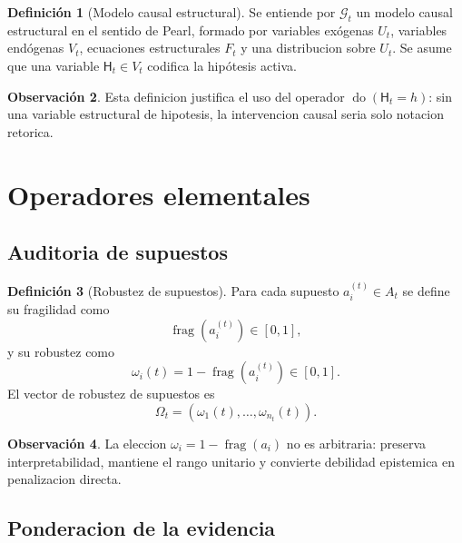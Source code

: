 \documentclass[12pt,a4paper]{article}
\newcommand{\doop}{\operatorname{do}}
\newcommand{\frag}{\operatorname{frag}}
\theoremstyle{definition}
\newtheorem{definition}{Definici\'on}[section]
\newtheorem{remark}[definition]{Observaci\'on}
\theoremstyle{plain}
\theoremstyle{remark}
\begin{document}
\begin{definition}[Modelo causal estructural]
Se entiende por $\mathcal{G}_t$ un modelo causal estructural en el sentido de Pearl, formado por variables ex\'ogenas $U_t$, variables end\'ogenas $V_t$, ecuaciones estructurales $F_t$ y una distribucion sobre $U_t$. Se asume que una variable $\mathsf{H}_t\in V_t$ codifica la hip\'otesis activa.
\end{definition}

\begin{remark}
Esta definicion justifica el uso del operador $\doop(\mathsf{H}_t=h)$: sin una variable estructural de hipotesis, la intervencion causal seria solo notacion retorica.
\end{remark}

\section{Operadores elementales}


\subsection{Auditoria de supuestos}

\begin{definition}[Robustez de supuestos]
Para cada supuesto $a_i^{(t)}\in A_t$ se define su fragilidad como
\begin{equation}
\frag(a_i^{(t)})\in[0,1],
\end{equation}
y su robustez como
\begin{equation}
\omega_i(t)=1-\frag(a_i^{(t)})\in[0,1].
\end{equation}
El vector de robustez de supuestos es
\begin{equation}
\Omega_t=(\omega_1(t),\dots,\omega_{n_t}(t)).
\end{equation}
\end{definition}

\begin{remark}
La eleccion $\omega_i=1-\frag(a_i)$ no es arbitraria: preserva interpretabilidad, mantiene el rango unitario y convierte debilidad epistemica en penalizacion directa.
\end{remark}

\subsection{Ponderacion de la evidencia}
\end{document}
